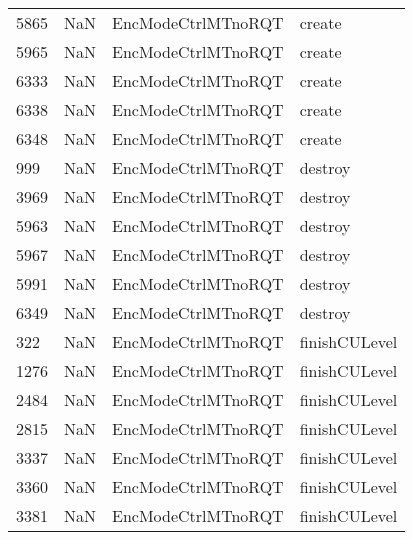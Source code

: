 \begin{tabular}{llll}
5865 &                   NaN &         EncModeCtrlMTnoRQT &                                    create \\
5965 &                   NaN &         EncModeCtrlMTnoRQT &                                    create \\
6333 &                   NaN &         EncModeCtrlMTnoRQT &                                    create \\
6338 &                   NaN &         EncModeCtrlMTnoRQT &                                    create \\
6348 &                   NaN &         EncModeCtrlMTnoRQT &                                    create \\
999  &                   NaN &         EncModeCtrlMTnoRQT &                                   destroy \\
3969 &                   NaN &         EncModeCtrlMTnoRQT &                                   destroy \\
5963 &                   NaN &         EncModeCtrlMTnoRQT &                                   destroy \\
5967 &                   NaN &         EncModeCtrlMTnoRQT &                                   destroy \\
5991 &                   NaN &         EncModeCtrlMTnoRQT &                                   destroy \\
6349 &                   NaN &         EncModeCtrlMTnoRQT &                                   destroy \\
322  &                   NaN &         EncModeCtrlMTnoRQT &                             finishCULevel \\
1276 &                   NaN &         EncModeCtrlMTnoRQT &                             finishCULevel \\
2484 &                   NaN &         EncModeCtrlMTnoRQT &                             finishCULevel \\
2815 &                   NaN &         EncModeCtrlMTnoRQT &                             finishCULevel \\
3337 &                   NaN &         EncModeCtrlMTnoRQT &                             finishCULevel \\
3360 &                   NaN &         EncModeCtrlMTnoRQT &                             finishCULevel \\
3381 &                   NaN &         EncModeCtrlMTnoRQT &                             finishCULevel \\

\end{tabular}
